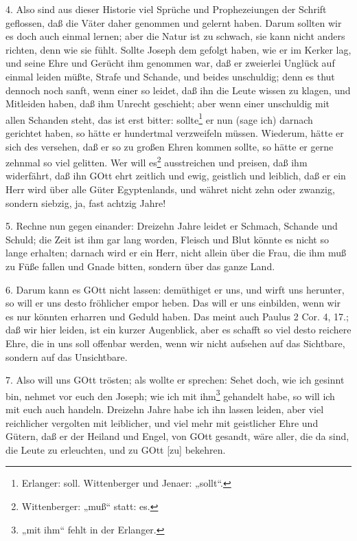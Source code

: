 4. Also sind aus dieser Historie viel Sprüche und Prophezeiungen der Schrift geflossen, daß die Väter daher genommen und gelernt haben. Darum sollten wir es doch auch einmal lernen; aber die Natur ist zu schwach, sie kann nicht anders richten, denn wie sie fühlt. Sollte Joseph dem gefolgt haben, wie er im Kerker lag, und seine Ehre und Gerücht ihm genommen war, daß er zweierlei Unglück auf einmal leiden müßte, Strafe und Schande, und beides unschuldig; denn es thut dennoch noch sanft, wenn einer so leidet, daß ihn die Leute wissen zu klagen, und Mitleiden haben, daß ihm Unrecht geschieht; aber wenn einer unschuldig mit allen Schanden steht, das ist erst bitter: sollte\footnote{Erlanger: soll. Wittenberger und Jenaer: „sollt“.} er nun (sage ich) darnach gerichtet haben, so hätte er hundertmal verzweifeln müssen. Wiederum, hätte er sich des versehen, daß er so zu großen Ehren kommen sollte, so hätte er gerne zehnmal so viel gelitten. Wer will es\footnote{Wittenberger: „muß“ statt: es.} ausstreichen und preisen, daß ihm widerfährt, daß ihn GOtt ehrt zeitlich und ewig, geistlich und leiblich, daß er ein Herr wird über alle Güter Egyptenlands, und währet nicht zehn oder zwanzig, sondern siebzig, ja, fast achtzig Jahre!

5. Rechne nun gegen einander: Dreizehn Jahre leidet er Schmach, Schande und Schuld; die Zeit ist ihm gar lang worden, Fleisch und Blut könnte es nicht so lange erhalten; darnach wird er ein Herr, nicht allein über die Frau, die ihm muß zu Füße fallen und Gnade bitten, sondern über das ganze Land.

6. Darum kann es GOtt nicht lassen: demüthiget er uns, und wirft uns herunter, so will er uns desto fröhlicher empor heben. Das will er uns einbilden, wenn wir es nur könnten erharren und Geduld haben. Das meint auch Paulus 2 Cor. 4, 17.; daß wir hier leiden, ist ein kurzer Augenblick, aber es schafft so viel desto reichere Ehre, die in uns soll offenbar werden, wenn wir nicht aufsehen auf das Sichtbare, sondern auf das Unsichtbare.

7. Also will uns GOtt trösten; als wollte er sprechen: Sehet doch, wie ich gesinnt bin, nehmet vor euch den Joseph; wie ich mit ihm\footnote{„mit ihm“ fehlt in der Erlanger.} gehandelt habe, so will ich mit euch auch handeln. Dreizehn Jahre habe ich ihn lassen leiden, aber viel reichlicher vergolten mit leiblicher, und viel mehr mit geistlicher Ehre und Gütern, daß er
der Heiland und Engel, von GOtt gesandt, wäre aller, die da sind, die Leute zu erleuchten, und zu GOtt [zu] bekehren.

